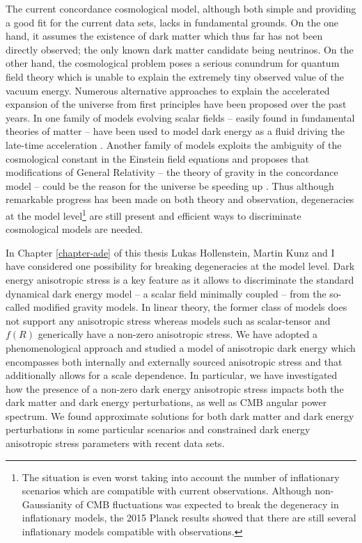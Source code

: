 The current concordance cosmological model, although both simple and providing a good fit for the current data sets, lacks in fundamental grounds. On the one hand, it assumes the existence of dark matter which thus far has not been directly observed; the only known dark matter candidate being neutrinos. On the other hand, the cosmological problem poses a serious conundrum for quantum field theory which is unable to explain the extremely tiny observed value of the vacuum energy. Numerous alternative approaches to explain the accelerated expansion of the universe from first principles have been proposed over the past years. In one family of models evolving scalar fields -- easily found in fundamental theories of matter -- have been used to model dark energy as a fluid driving the late-time acceleration . Another family of models exploits the ambiguity of the cosmological constant in the Einstein field equations and proposes that modifications of General Relativity -- the theory of gravity in the concordance model -- could be the reason for the universe be speeding up . Thus although remarkable progress has been made on both theory and observation, degeneracies at the model level\footnote{The situation is even worst taking into account the number of inflationary scenarios which are compatible with current observations. Although non-Gaussianity of CMB fluctuations was expected to break the degeneracy in inflationary models, the 2015 Planck results  showed that there are still several inflationary models compatible with observations.} are still present and efficient ways to discriminate cosmological models are needed.   

In Chapter \ref{chapter-ade} of this thesis Lukas Hollenstein, Martin Kunz and I have considered one possibility for breaking degeneracies at the model level. Dark energy anisotropic stress is a key feature as it allows to discriminate the standard dynamical dark energy model -- a scalar field minimally coupled -- from the so-called modified gravity models. In linear theory, the former class of models does not support any anisotropic stress whereas models such as scalar-tensor and $f(R)$ generically have a non-zero anisotropic stress. We have adopted a phenomenological approach and studied a model of anisotropic dark energy which encompasses both internally and externally sourced anisotropic stress and that additionally allows for a scale dependence. In particular, we have investigated how the presence of a non-zero dark energy anisotropic stress impacts both the dark matter and dark energy perturbations, as well as CMB angular power spectrum. We found approximate solutions for both dark matter and dark energy perturbations in some particular scenarios and constrained dark energy anisotropic stress parameters with recent data sets. 

